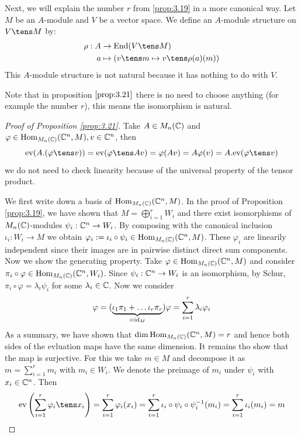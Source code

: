 \documentclass[twoside = false,	%
		headsepline,		%
		parskip = true,
		]{scrbook}						%
\begin{document}
    Next, we will explain the number $r$ from \ref{prop:3.19} in a more canonical way.
    Let $M$ be an $A$-module and $V$ be a vector space. We define an $A$-module structure on $V \tens M$ by:
    \begin{equation*}
    \begin{split}
        \rho: A &\to \End(V \tens M)\\
            a &\mapsto \round{v \tens m \mapsto v \tens \rho(a)(m)}
    \end{split}
    \end{equation*}
    This $A$-module structure is not natural because it has nothing to do with $V$.

    Note that in proposition $\ref{prop:3.21}$ there is no need to choose anything (for example the number $r$), this means the isomorphism is natural.

    \begin{proof}[Proof of Proposition \ref{prop:3.21}]

        Take $A \in M_n(\mathbb C)$ and $\varphi \in \mathrm{Hom}_{M_n(\mathbb C)}(\mathbb C^n, M), v \in \mathbb C^n$, then
        \begin{equation*}
            \ev(A.(\varphi \tens v)) = \ev(\varphi \tens Av) = \varphi(Av) = A \varphi(v) = A.\ev(\varphi \tens v)
        \end{equation*}
        we do not need to check linearity because of the universal property of the tensor product.

        We first write down a basis of $\mathrm{Hom}_{M_n(\mathbb C)}(\mathbb C^n,M)$. In the proof of Proposition \ref{prop:3.19}, we have shown that $M = \bigoplus_{i=1}^r W_i$ and there exist isomorphisms of $M_n(\mathbb C)$-modules $\psi_i:\mathbb C^n \to W_i$. By composing with the canonical inclusion $\iota_i: W_i \to M$ we obtain $\varphi_i:= \iota_i \circ \psi_i \in \mathrm{Hom}_{M_n(\mathbb C)}(\mathbb C^n,M)$. These $\varphi_i$ are linearily independent since their images are in pairwise distinct direct sum components.
        Now we show the generating property. Take $\varphi \in \mathrm{Hom}_{M_n(\mathbb C)}(\mathbb C^n,M)$ and consider $\pi_i \circ \varphi \in \mathrm{Hom}_{M_n(\mathbb C)}(\mathbb C^n,W_i)$. Since $\psi_i: \mathbb C^n \to W_i$ is an isomorphism, by Schur, $\pi_i \circ \varphi = \lambda_i \psi_i$ for some $\lambda_i \in \mathbb C$. Now we consider
        \begin{equation*}
            \varphi = (\underbrace{\iota_1\pi_1 + \dots \iota_r \pi_r}_{=\mathrm{id}_M})\varphi = \sum_{i=1}^r \lambda_i \varphi_i
        \end{equation*}
        As a summary, we have shown that $\dim \mathrm{Hom}_{M_n(\mathbb C)}(\mathbb C^n,M) = r$ and hence both sides of the evluation maps have the same dimension. It remains tho show that the map is surjective. For this we take $m \in M$ and decompose it as $m = \sum_{i=1}^r m_i$ with $m_i \in W_i$. We denote the preimage of $m_i$ under $\psi_i$ with $x_i \in \mathbb C^n$. Then
        \begin{equation*}
            \ev \round{\sum_{i=1}^r \varphi_i \tens x_i} = \sum_{i=1}^r \varphi_i(x_i) = \sum_{i=1}^r \iota_i \circ \psi_i \circ \psi_i^{-1}(m_i) = \sum_{i=1}^r \iota_i(m_i) = m
        \end{equation*}
    \end{proof}
\end{document}
